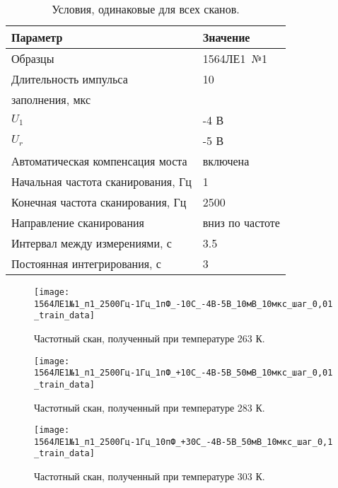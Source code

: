 	\begin{table}[!ht]
		\centering
		\caption{Условия, одинаковые для всех сканов.}
		\begin{tabular}{|l|l|}
			\hline
			Параметр                           & Значение             \\ \hline
			Образцы                            & 1564ЛЕ1~№1           \\ \hline
			Длительность импульса              & 10                   \\ 
			заполнения, мкс                    &                      \\ \hline
			$U_1$                              & -4 В                 \\ \hline
			$U_r$                              & -5 В                 \\ \hline
			Автоматическая компенсация моста   & включена             \\ \hline
			Начальная частота сканирования, Гц & 1                    \\ \hline
			Конечная  частота сканирования, Гц & 2500                 \\ \hline
			Направление сканирования           & вниз по частоте      \\ \hline
			Интервал между измерениями, с      & 3.5                  \\ \hline
			Постоянная интегрирования, с       & 3                    \\ \hline
		\end{tabular}
		\label{table:common_conditions}
	\end{table}

	\begin{figure}[!htp]
		\centering
		\texttt{[image: 1564ЛЕ1№1\_п1\_2500Гц-1Гц\_1пФ\_-10С\_-4В-5В\_10мВ\_10мкс\_шаг\_0,01\_train\_data]}
		\caption{Частотный скан, полученный при температуре 263 К.}
		\label{pic:train_data_263}
	\end{figure}

	\begin{figure}[!htp]
		\centering
		\texttt{[image: 1564ЛЕ1№1\_п1\_2500Гц-1Гц\_1пФ\_+10С\_-4В-5В\_50мВ\_10мкс\_шаг\_0,01\_train\_data]}
		\caption{Частотный скан, полученный при температуре 283 К.}
		\label{pic:train_data_283}
	\end{figure}

	\begin{figure}[!htp]
		\centering
		\texttt{[image: 1564ЛЕ1№1\_п1\_2500Гц-1Гц\_10пФ\_+30С\_-4В-5В\_50мВ\_10мкс\_шаг\_0,1\_train\_data]}
		\caption{Частотный скан, полученный при температуре 303 К.}
		\label{pic:train_data_303}
	\end{figure}


